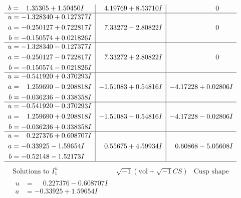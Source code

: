 \documentclass[1p]{elsarticle_modified}
\theoremstyle{definition}
\newcommand{\I}{\sqrt{-1}}
\begin{document}
$$\begin{array}{c|c|c}
\begin{aligned}
b &= \phantom{-}1.35305 + 1.50450 I\end{aligned}
 & \phantom{-}4.19769 + 8.53710 I & \phantom{-0.000000 } 0 \\ \hline\begin{aligned}
u &= -1.328340 + 0.127377 I \\
a &= -0.250127 + 0.722817 I \\
b &= -0.150574 + 0.021826 I\end{aligned}
 & \phantom{-}7.33272 - 2.80822 I & \phantom{-0.000000 } 0 \\ \hline\begin{aligned}
u &= -1.328340 - 0.127377 I \\
a &= -0.250127 - 0.722817 I \\
b &= -0.150574 - 0.021826 I\end{aligned}
 & \phantom{-}7.33272 + 2.80822 I & \phantom{-0.000000 } 0 \\ \hline\begin{aligned}
u &= -0.541920 + 0.370293 I \\
a &= \phantom{-}1.259690 - 0.208818 I \\
b &= -0.036236 - 0.338358 I\end{aligned}
 & -1.51083 + 0.54816 I & -4.17228 + 0.02806 I \\ \hline\begin{aligned}
u &= -0.541920 - 0.370293 I \\
a &= \phantom{-}1.259690 + 0.208818 I \\
b &= -0.036236 + 0.338358 I\end{aligned}
 & -1.51083 - 0.54816 I & -4.17228 - 0.02806 I \\ \hline\begin{aligned}
u &= \phantom{-}0.227376 + 0.608707 I \\
a &= -0.33925 - 1.59654 I \\
b &= -0.52148 - 1.52173 I\end{aligned}
 & \phantom{-}0.55675 + 4.59934 I & \phantom{-}0.60868 - 5.05608 I\\
 \hline 
 \end{array}$$\newpage$$\begin{array}{c|c|c}  
\text{Solutions to }I^u_{1}& \I (\text{vol} + \sqrt{-1}CS) & \text{Cusp shape}\\
 \hline 
\begin{aligned}
u &= \phantom{-}0.227376 - 0.608707 I \\
a &= -0.33925 + 1.59654 I \\

\end{aligned}
\end{array}$$
\end{document}
